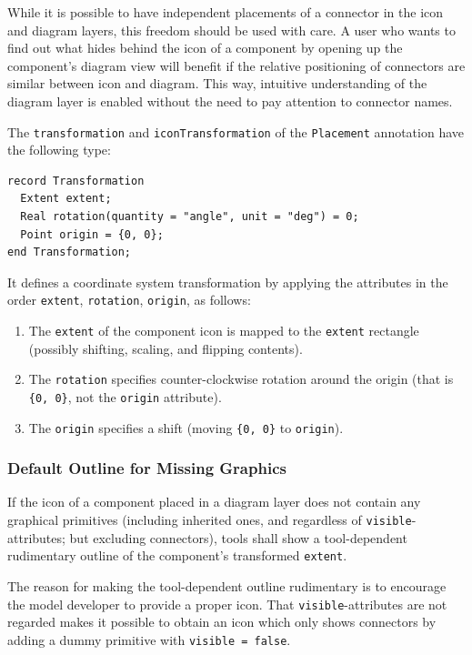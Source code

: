 \begin{nonnormative}
While it is possible to have independent placements of a connector in the icon and diagram layers, this freedom should be used with care.
A user who wants to find out what hides behind the icon of a component by opening up the component's diagram view will benefit if the relative positioning of connectors are similar between icon and diagram.
This way, intuitive understanding of the diagram layer is enabled without the need to pay attention to connector names.
\end{nonnormative}

The \lstinline!transformation! and \lstinline!iconTransformation! of the \lstinline!Placement! annotation have the following type:
\begin{lstlisting}[language=modelica]
record Transformation
  Extent extent;
  Real rotation(quantity = "angle", unit = "deg") = 0;
  Point origin = {0, 0};
end Transformation;
\end{lstlisting}%

It defines a coordinate system transformation by applying the attributes in the order \lstinline!extent!, \lstinline!rotation!, \lstinline!origin!, as follows:
\begin{enumerate}
\item
  The \lstinline!extent! of the component icon is mapped to the \lstinline!extent! rectangle (possibly shifting, scaling, and flipping contents).
\item
  The \lstinline!rotation! specifies counter-clockwise rotation around the origin (that is \lstinline!{0, 0}!, not the \lstinline!origin! attribute).
\item
  The \lstinline!origin! specifies a shift (moving \lstinline!{0, 0}! to \lstinline!origin!).
\end{enumerate}


\subsubsection{Default Outline for Missing Graphics}\label{default-outline-for-missing-graphics}

If the icon of a component placed in a diagram layer does not contain any graphical primitives (including inherited ones, and regardless of \lstinline!visible!-attributes; but excluding connectors), tools shall show a tool-dependent rudimentary outline of the component's transformed \lstinline!extent!.

\begin{nonnormative}
The reason for making the tool-dependent outline rudimentary is to encourage the model developer to provide a proper icon.
That \lstinline!visible!-attributes are not regarded makes it possible to obtain an icon which only shows connectors by adding a dummy primitive with \lstinline!visible = false!.
\end{nonnormative}

